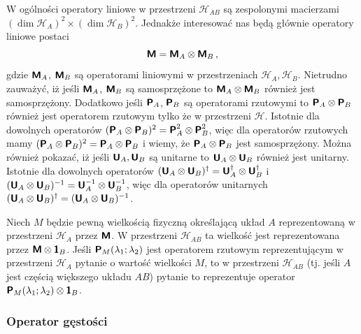 \documentclass{myclass}
\begin{document}
W ogólności operatory liniowe w przestrzeni \(\mathscr{H}_{AB}\) są zespolonymi macierzami
\((\dim{\mathscr{H}_A})^2\times(\dim{\mathscr{H}_B})^2\). Jednakże interesować nas będą głównie
operatory liniowe postaci
\begin{equation*}
    \boldsymbol{\mathsf{M}} = \boldsymbol{\mathsf{M}}_A \otimes \boldsymbol{\mathsf{M}}_B\,,
\end{equation*}
gdzie \(\boldsymbol{\mathsf{M}}_A\), \(\boldsymbol{\mathsf{M}}_B\) są operatorami liniowymi w przestrzeniach \(\mathscr{H}_A,
\mathscr{H}_B\). Nietrudno zauważyć, iż jeśli \(\boldsymbol{\mathsf{M}}_A\), \(\boldsymbol{\mathsf{M}}_B\) są samosprzężone to
\(\boldsymbol{\mathsf{M}}_A \otimes \boldsymbol{\mathsf{M}}_B\) również jest samosprzężony. Dodatkowo jeśli \(\boldsymbol{\mathsf{P}}_A\),
\(\boldsymbol{\mathsf{P}}_B\) są operatorami rzutowymi to \(\boldsymbol{\mathsf{P}}_A \otimes \boldsymbol{\mathsf{P}}_B\) również jest operatorem
rzutowym tylko że w przestrzeni \(\mathscr{H}\). Istotnie dla dowolnych operatorów \((\boldsymbol{\mathsf{P}}_A
\otimes \boldsymbol{\mathsf{P}}_B)^2 = \boldsymbol{\mathsf{P}}_A^2 \otimes \boldsymbol{\mathsf{P}}_B^2\), więc dla operatorów rzutowych mamy
\((\boldsymbol{\mathsf{P}}_A \otimes \boldsymbol{\mathsf{P}}_B)^2 = \boldsymbol{\mathsf{P}}_A \otimes \boldsymbol{\mathsf{P}}_B\) i wiemy, że \(\boldsymbol{\mathsf{P}}_A
\otimes \boldsymbol{\mathsf{P}}_B\) jest samosprzężony. Można również pokazać, iż jeśli \(\boldsymbol{\mathsf{U}}_A, \boldsymbol{\mathsf{U}}_B\)
są unitarne to \(\boldsymbol{\mathsf{U}}_A \otimes \boldsymbol{\mathsf{U}}_B\) również jest unitarny. Istotnie dla dowolnych
operatorów \((\boldsymbol{\mathsf{U}}_A \otimes \boldsymbol{\mathsf{U}}_B)^\dagger = \boldsymbol{\mathsf{U}}_A^\dagger\otimes\boldsymbol{\mathsf{U}}_B^\dagger\)
i \((\boldsymbol{\mathsf{U}}_A \otimes \boldsymbol{\mathsf{U}}_B)^{-1} = \boldsymbol{\mathsf{U}}_A^{-1}\otimes\boldsymbol{\mathsf{U}}_B^{-1}\), więc dla
operatorów unitarnych \((\boldsymbol{\mathsf{U}}_A \otimes \boldsymbol{\mathsf{U}}_B)^\dagger = (\boldsymbol{\mathsf{U}}_A \otimes
\boldsymbol{\mathsf{U}}_B)^{-1}\).

Niech \(M\) będzie pewną wielkością fizyczną określającą układ \(A\) reprezentowaną w przestrzeni
\(\mathscr{H}_A\) przez \(\boldsymbol{\mathsf{M}}\). W przestrzeni \(\mathscr{H}_{AB}\) ta wielkość jest
reprezentowana przez \(\boldsymbol{\mathsf{M}}\otimes\boldsymbol{\mathsf{1}}_B\). Jeśli \(\boldsymbol{\mathsf{P}}_M(\lambda_1 ; \lambda_2)\) jest
operatorem rzutowym reprezentującym w przestrzeni \(\mathscr{H}_A\) pytanie o wartość wielkości
\(M\), to w przestrzeni \(\mathscr{H}_{AB}\) (tj. jeśli \(A\) jest częścią większego układu \(AB\))
pytanie to reprezentuje operator \(\boldsymbol{\mathsf{P}}_M(\lambda_1;\lambda_2)\otimes\boldsymbol{\mathsf{1}}_B\).

\subsubsection{Operator gęstości}
\end{document}
